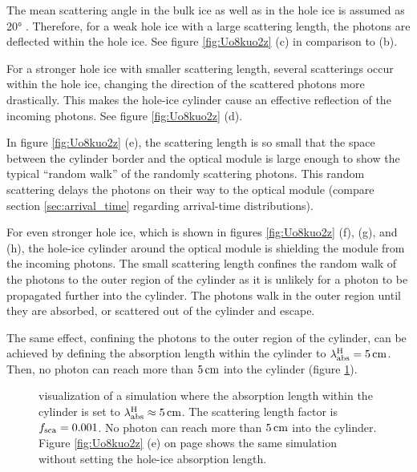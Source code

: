 The mean scattering angle in the bulk ice as well as in the hole ice is
assumed as \ang{20} \cite{escawiki}. Therefore, for a weak hole ice with
a large scattering length, the photons are deflected within the hole
ice. See figure \ref{fig:Uo8kuo2z} (c) in comparison to (b).

For a stronger hole ice with smaller scattering length, several
scatterings occur within the hole ice, changing the direction of the
scattered photons more drastically. This makes the hole-ice cylinder
cause an effective reflection of the incoming photons. See figure
\ref{fig:Uo8kuo2z} (d).

In figure \ref{fig:Uo8kuo2z} (e), the scattering length is so small that
the space between the cylinder border and the optical module is large
enough to show the typical ``random walk'' \cite{randomwalk} of the
randomly scattering photons. This random scattering delays the photons
on their way to the optical module (compare section
\ref{sec:arrival_time} regarding arrival-time distributions).

For even stronger hole ice, which is shown in figures \ref{fig:Uo8kuo2z}
(f), (g), and (h), the hole-ice cylinder around the optical module is
shielding the module from the incoming photons. The small scattering
length confines the random walk of the photons to the outer region of
the cylinder as it is unlikely for a photon to be propagated further
into the cylinder. The photons walk in the outer region until they are
absorbed, or scattered out of the cylinder and escape.

The same effect, confining the photons to the outer region of the
cylinder, can be achieved by defining the absorption length within the
cylinder to \(\lambda_\text{abs}^\text{H} = 5\text{\,cm}\). Then, no photon can reach more
than \(5\text{\,cm}\) into the cylinder (figure \ref{fig:Lie7laxa}).

\begin{figure}[htbp]
  \caption{\steamshovel visualization of a simulation where the absorption length within the cylinder is set to $\lambda_\text{abs}^\text{H} \approx 5\text{\,cm}$. The scattering length factor is $f_\text{sca}=0.001$. No photon can reach more than $5\text{\,cm}$ into the cylinder. Figure \ref{fig:Uo8kuo2z} (e) on page \pageref{fig:Uo8kuo2z} shows the same simulation without setting the hole-ice absorption length.}
  \label{fig:Lie7laxa}
\end{figure}

